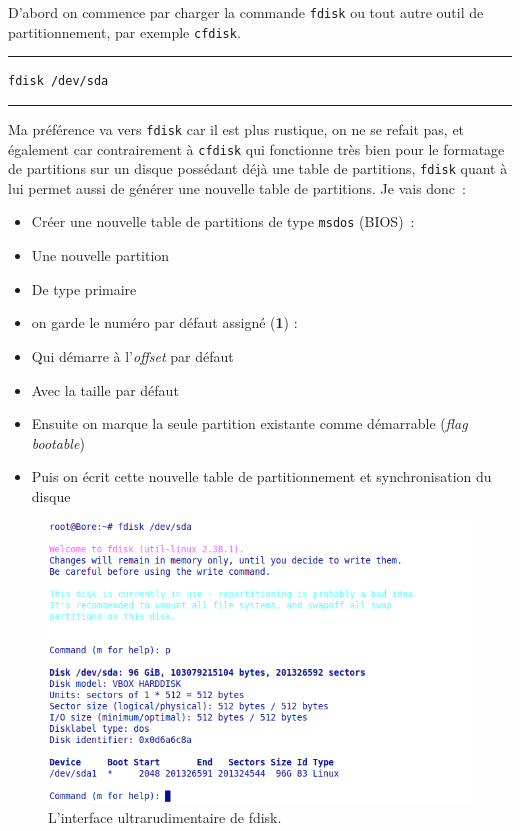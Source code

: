 \documentclass[12pt, a4paper]{report}
\begin{document}
D'abord on commence par charger la commande \texttt{fdisk} ou tout autre outil de partitionnement, par exemple \texttt{cfdisk}.

\noindent \rule{\linewidth}{0.5pt}
\begin{verbatim}
fdisk /dev/sda
\end{verbatim}
\rule{\linewidth}{0.5pt}

Ma préférence va vers \texttt{fdisk} car il est plus rustique, on ne se refait pas, et également car contrairement à \texttt{cfdisk} qui fonctionne très bien pour le formatage de partitions sur un disque possédant déjà une table de partitions, \texttt{fdisk} quant à lui permet aussi de générer une nouvelle table de partitions. 
Je vais donc~:
\begin{itemize}
	\item Créer une nouvelle table de partitions de type \texttt{msdos} (BIOS)~:  
	\item Une nouvelle partition  
	\item De type primaire 
	\item on garde le numéro par défaut assigné (\textbf{1}) :  
	\item Qui démarre à l'\emph{offset} par défaut  
	\item Avec la taille par défaut  
	\item Ensuite on marque la seule partition existante comme démarrable (\emph{flag bootable})  
	\item Puis on écrit cette nouvelle table de partitionnement et synchronisation du disque 
\end{itemize}

\begin{figure}
	\centering
	\includegraphics{fdisk.png}
	\caption{L'interface ultrarudimentaire de fdisk.}
\end{figure}
\end{document}
